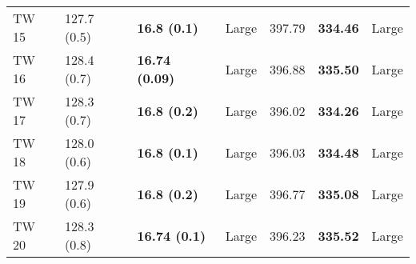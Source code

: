 \begin{tabular}{lllllll}
 TW 15 &       127.7 (0.5) &    \textbf{16.8 (0.1)} &       Large &                  397.79 &          \textbf{334.46} &       Large \\
 TW 16 &       128.4 (0.7) &  \textbf{16.74 (0.09)} &       Large &                  396.88 &          \textbf{335.50} &       Large \\
 TW 17 &       128.3 (0.7) &    \textbf{16.8 (0.2)} &       Large &                  396.02 &          \textbf{334.26} &       Large \\
 TW 18 &       128.0 (0.6) &    \textbf{16.8 (0.1)} &       Large &                  396.03 &          \textbf{334.48} &       Large \\
 TW 19 &       127.9 (0.6) &    \textbf{16.8 (0.2)} &       Large &                  396.77 &          \textbf{335.08} &       Large \\
 TW 20 &       128.3 (0.8) &   \textbf{16.74 (0.1)} &       Large &                  396.23 &          \textbf{335.52} &       Large \\
\bottomrule
\end{tabular}
